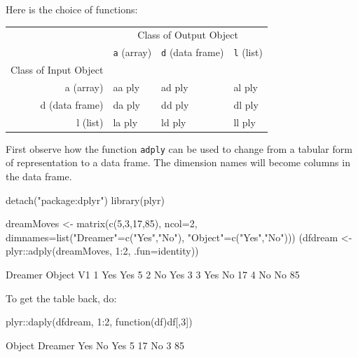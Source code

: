 \documentclass{tufte-book}\usepackage[]{graphicx}\usepackage[]{color}
\newcommand{\txtt}[1]{\texttt{#1}}
\begin{document}
Here is the choice of functions:
\begin{center}
\begin{tabular}{rlll}
  \hline
& \multicolumn{3}{c}{Class of Output Object}\\
 & \txtt{a} (array) & \txtt{d} (data frame) & \txtt{l} (list) \\
  \hline
Class of Input Object\\
a (array) & aa{\color{gray40} ply} & ad{\color{gray40} ply} & al{\color{gray40} ply} \\
  d (data frame) & da{\color{gray40} ply} & dd{\color{gray40} ply} & dl{\color{gray40} ply} \\
  l (list) & la{\color{gray40} ply} & ld{\color{gray40} ply} & ll{\color{gray40} ply} \\
   \hline
\end{tabular}
\end{center}

First observe how the function \txtt{adply} can be used to change from
a tabular form of representation to a data frame.  The dimension names
will become columns in the data frame.

\noindent
\begin{minipage}[t]{\textwidth}
\begin{Schunk}
\begin{Sinput}
detach("package:dplyr")
library(plyr)
\end{Sinput}
\begin{Sinput}
dreamMoves <-
   matrix(c(5,3,17,85), ncol=2,
          dimnames=list("Dreamer"=c("Yes","No"),
                        "Object"=c("Yes","No")))
(dfdream <- plyr::adply(dreamMoves, 1:2,
                        .fun=identity))
\end{Sinput}
\begin{Soutput}
  Dreamer Object V1
1     Yes    Yes  5
2      No    Yes  3
3     Yes     No 17
4      No     No 85
\end{Soutput}
\end{Schunk}
\end{minipage}

To get the table back, do:
\begin{Schunk}
\begin{Sinput}
plyr::daply(dfdream, 1:2, function(df)df[,3])
\end{Sinput}
\begin{Soutput}
       Object
Dreamer Yes No
    Yes   5 17
    No    3 85
\end{Soutput}
\end{Schunk}
\end{document}
